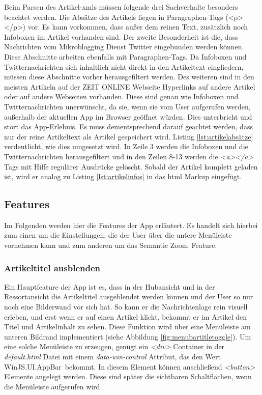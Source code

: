 \documentclass[12pt,a4paper,bibtotoc,abstracton]{scrartcl}
\begin{document}
Beim Parsen des Artikel-\ac{xml}s müssen folgende drei Sachverhalte besonders beachtet werden. Die Absätze des Artikels liegen in Paragraphen-Tags (<p></p>) vor. Es kann vorkommen, dass außer dem reinen Text, zusätzlich noch Infoboxen im Artikel vorhanden sind. Der zweite Besonderheit ist die, dass Nachrichten vom Mikroblogging Dienst Twitter eingebunden werden können. Diese Abschnitte arbeiten ebenfalls mit Paragraphen-Tags. Da Infoboxen und Twitternachrichten sich inhaltlich nicht direkt in den Artikeltext eingliedern, müssen diese Abschnitte vorher herausgefiltert werden. Des weiteren sind in den meisten Artikeln auf der ZEIT ONLINE Webseite Hyperlinks auf andere Artikel oder auf andere Webseiten vorhanden. Diese sind genau wie Infoboxen und Twitternachrichten unerwünscht, da sie, wenn sie vom User aufgerufen werden, außerhalb der aktuellen App im Browser geöffnet würden. Dies unterbricht und stört das App-Erlebnis. Es muss dementsprechend darauf geachtet werden, dass nur der reine Artikeltext als Artikel gespeichert wird. Listing \ref{lst:artikelabsätze} verdeutlicht, wie dies umgesetzt wird. In Zeile 3 werden die Infoboxen und die Twitternachrichten herausgefiltert und in den Zeilen 8-13 werden die \textit{<a></a>} Tags mit Hilfe regulärer Ausdrücke gelöscht. Sobald der Artikel komplett geladen ist, wird er analog zu Listing \ref{lst:artikelinfos} in das \ac{html} Markup eingefügt.

\begin{minipage}{\linewidth}
  
\end{minipage}

\subsection{Features}
\label{subsec:features}
Im Folgenden werden hier die Features der App erläutert. Es handelt sich hierbei zum einen um die Einstellungen, die der User über die untere Menüleiste vornehmen kann und zum anderen um das \glqq Semantic Zoom\grqq\ Feature.

\subsubsection{Artikeltitel ausblenden}
\label{subsubsec:artikeltitelausblenden}
Ein Hauptfeature der App ist es, dass in der Hubansicht und in der Ressortansicht die Artikeltitel ausgeblendet werden können und der User so nur noch eine Bilderwand vor sich hat. So kann er die Nachrichtenlage rein visuell erleben, und erst wenn er auf einen Artikel klickt, bekommt er im Artikel den Titel und Artikelinhalt zu sehen. Diese Funktion wird über eine Menüleiste am unteren Bildrand implementiert (siehe Abbildung \ref{fig:menubartitletoggle}). Um eine solche Menüleiste zu erzeugen, genügt ein \textit{<div>} Container in der \textit{default.html} Datei mit einem \textit{data-win-control} Attribut, das den Wert \glqq WinJS.UI.AppBar\grqq\ bekommt. In diesem Element können anschließend \textit{<button>} Elemente angelegt werden. Diese sind später die sichtbaren Schaltflächen, wenn die Menüleiste aufgerufen wird.
\end{document}
